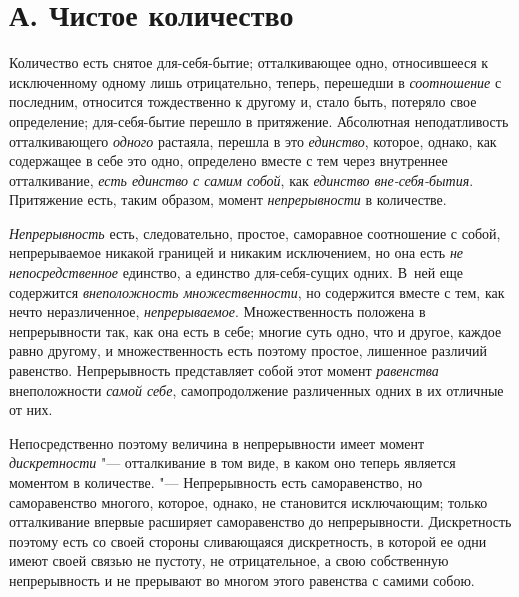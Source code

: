 \section[А. Чистое количество]{А. Чистое количество}

Количество есть снятое для-себя-бытие; отталкивающее одно, относившееся к
исключенному одному лишь отрицательно, теперь, перешедши в
{\em соотношение} с последним, относится тождественно к
другому и, стало быть, потеряло свое определение; для-себя-бытие перешло в
притяжение. Абсолютная неподатливость отталкивающего
{\em одного} растаяла, перешла в это
{\em единство}, которое, однако, как содержащее в себе
это одно, определено вместе с тем через внутреннее отталкивание,
{\em есть единство с самим собой}, как
{\em единство вне-себя-бытия}. Притяжение есть, таким
образом, момент {\em непрерывности} в количестве.

{\em Непрерывность} есть, следовательно, простое,
саморавное соотношение с собой, непрерываемое никакой границей и никаким
исключением, но она есть {\em не непосредственное}
единство, а единство для-себя-сущих одних. В~ней еще содержится
{\em внеположность множественности}, но содержится
вместе с тем, как нечто неразличенное,
{\em непрерываемое}. Множественность положена в
непрерывности так, как она есть в себе; многие суть одно, что и другое,
каждое равно другому, и множественность есть поэтому простое, лишенное
различий равенство. Непрерывность представляет собой этот момент
{\em равенства} внеположности {\em самой себе}, самопродолжение
различенных одних в их отличные от них.

Непосредственно поэтому величина в непрерывности имеет момент
{\em дискретности} "--- отталкивание в том виде, в каком
оно теперь является моментом в количестве. "--- Непрерывность есть
саморавенство, но саморавенство многого, которое, однако, не становится
исключающим; только отталкивание впервые расширяет саморавенство до
непрерывности. Дискретность поэтому есть со своей стороны сливающаяся
дискретность, в которой ее одни имеют своей связью не пустоту, не
отрицательное, а свою собственную непрерывность и не прерывают во многом
этого равенства с самими собою.

